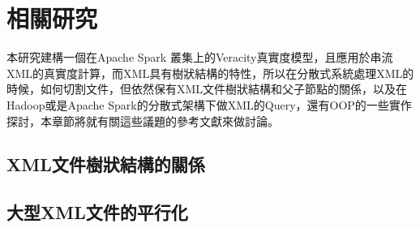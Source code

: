 \section{相關研究}
本研究建構一個在Apache Spark 叢集上的Veracity真實度模型，且應用於串流XML的真實度計算，而XML具有樹狀結構的特性，所以在分散式系統處理XML的時候，如何切割文件，但依然保有XML文件樹狀結構和父子節點的關係，以及在Hadoop或是Apache Spark的分散式架構下做XML的Query，還有OOP的一些實作探討，本章節將就有關這些議題的參考文獻來做討論。
\subsection{XML文件樹狀結構的關係}
\subsection{大型XML文件的平行化}